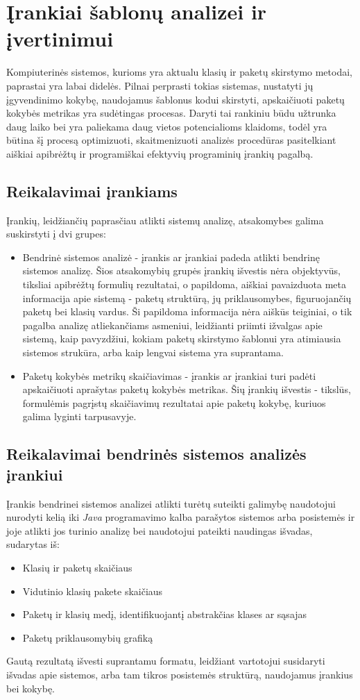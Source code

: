 \section{Įrankiai šablonų analizei ir įvertinimui}
Kompiuterinės sistemos, kurioms yra aktualu klasių ir paketų skirstymo metodai, paprastai yra labai didelės.
Pilnai perprasti tokias sistemas, nustatyti jų įgyvendinimo kokybę, naudojamus šablonus kodui skirstyti,
apskaičiuoti paketų kokybės metrikas yra sudėtingas procesas.
Daryti tai rankiniu būdu užtrunka daug laiko bei yra paliekama daug vietos potencialioms klaidoms,
todėl yra būtina šį procesą optimizuoti, skaitmenizuoti analizės procedūras pasitelkiant
aiškiai apibrėžtų ir programiškai efektyvių programinių įrankių pagalbą.

\subsection{Reikalavimai įrankiams}
Įrankių, leidžiančių paprasčiau atlikti sistemų analizę, atsakomybes galima suskirstyti į dvi grupes:
\begin{itemize}
    \item Bendrinė sistemos analizė - įrankis ar įrankiai padeda atlikti bendrinę sistemos analizę.
    Šios atsakomybių grupės įrankių išvestis nėra objektyvūs, tiksliai apibrėžtų formulių rezultatai, o papildoma, aiškiai
    pavaizduota meta informacija apie sistemą - paketų struktūrą, jų priklausomybes, figuruojančių paketų bei klasių vardus.
    Ši papildoma informacija nėra aiškūs teiginiai, o tik pagalba analizę atliekančiams asmeniui, leidžianti priimti ižvalgas apie sistemą,
    kaip pavyzdžiui, kokiam paketų skirstymo šablonui yra atimiausia sistemos strukūra, arba kaip lengvai sistema yra suprantama.
    \item Paketų kokybės metrikų skaičiavimas - įrankis ar įrankiai turi padėti apskaičiuoti aprašytas paketų kokybės metrikas.
    Šių įrankių išvestis - tikslūs, formulėmis pagrįstų skaičiavimų rezultatai apie paketų kokybę, kuriuos galima lyginti tarpusavyje.
\end{itemize}

\subsection{Reikalavimai bendrinės sistemos analizės įrankiui}
Įrankis bendrinei sistemos analizei atlikti turėtų suteikti galimybę naudotojui nurodyti kelią iki \textit{Java} programavimo kalba parašytos sistemos arba posistemės ir joje
atlikti jos turinio analizę bei naudotojui pateikti naudingas išvadas, sudarytas iš:
\begin{itemize}
    \item Klasių ir paketų skaičiaus
    \item Vidutinio klasių pakete skaičiaus
    \item Paketų ir klasių medį, identifikuojantį abstrakčias klases ar sąsajas
    \item Paketų priklausomybių grafiką
\end{itemize}
Gautą rezultatą išvesti suprantamu formatu, leidžiant vartotojui susidaryti išvadas apie sistemos, arba tam tikros
posistemės struktūrą, naudojamus įrankius bei kokybę.

